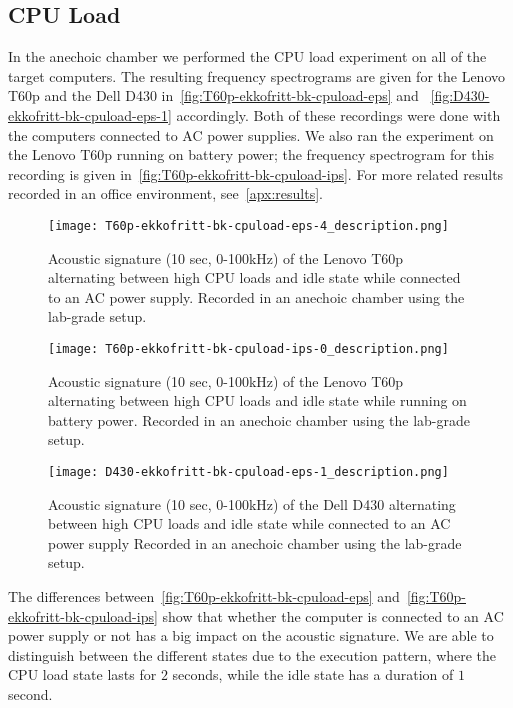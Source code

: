 \subsection{CPU Load}\label{chp5:subsec:t60p_bk_results_cpuload}
In the anechoic chamber we performed the \gls{CPU} load experiment on all of the target computers.
The resulting frequency spectrograms are given for the Lenovo T60p and the Dell D430 in~\autoref{fig:T60p-ekkofritt-bk-cpuload-eps} and ~\autoref{fig:D430-ekkofritt-bk-cpuload-eps-1} accordingly.
Both of these recordings were done with the computers connected to AC power supplies.
We also ran the experiment on the Lenovo T60p running on battery power; the frequency spectrogram for this recording is given in~\autoref{fig:T60p-ekkofritt-bk-cpuload-ips}.
For more related results recorded in an office environment, see~\autoref{apx:results}.


\begin{figure}[ht]
    \centering
    \texttt{[image: T60p-ekkofritt-bk-cpuload-eps-4\_description.png]}
    \caption{Acoustic signature (10 sec, 0-100kHz) of the Lenovo T60p alternating between high CPU loads and idle state while connected to an AC power supply. 
        Recorded in an anechoic chamber using the lab-grade setup.}
    \label{fig:T60p-ekkofritt-bk-cpuload-eps}
\end{figure}


\begin{figure}[ht]
    \centering
    \texttt{[image: T60p-ekkofritt-bk-cpuload-ips-0\_description.png]}
    \caption{Acoustic signature (10 sec, 0-100kHz) of the Lenovo T60p alternating between high CPU loads and idle state while running on battery power. 
        Recorded in an anechoic chamber using the lab-grade setup.}
    \label{fig:T60p-ekkofritt-bk-cpuload-ips}
\end{figure}


\begin{figure}[ht]
    \centering
    \texttt{[image: D430-ekkofritt-bk-cpuload-eps-1\_description.png]}
    \caption{Acoustic signature (10 sec, 0-100kHz) of the Dell D430 alternating between high CPU loads and idle state while connected to an AC power supply
        Recorded in an anechoic chamber using the lab-grade setup.}
    \label{fig:D430-ekkofritt-bk-cpuload-eps-1}
\end{figure}

The differences between~\autoref{fig:T60p-ekkofritt-bk-cpuload-eps} and~\autoref{fig:T60p-ekkofritt-bk-cpuload-ips} show that whether the computer is connected to an AC power supply or not has a big impact on the acoustic signature.
We are able to distinguish between the different states due to the execution pattern, where the CPU load state lasts for $2$ seconds, while the idle state has a duration of $1$ second.


